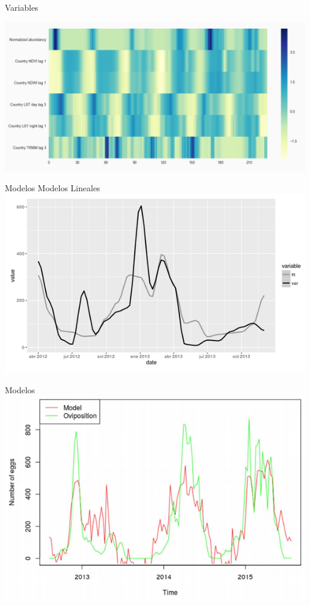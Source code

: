 \documentclass[10pt]{beamer}
\begin{document}
\begin{frame}{Variables}


  \includegraphics[width=1\textwidth]{selected_variables.png}


\end{frame}

\begin{frame}{Modelos}
  \centering
  Modelos Lineales
  \includegraphics[width=\textwidth]{lineal1.png}
\end{frame}

\begin{frame}{Modelos}
  \includegraphics[width=\textwidth]{lineal2.png}
\end{frame}
\end{document}
